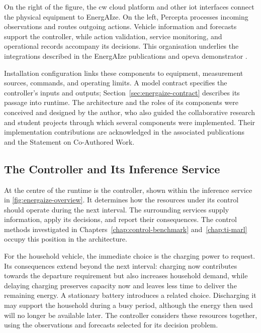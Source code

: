 \begin{samepage}
On the right of the figure, the \gls{cw} cloud platform and other \gls{iot} interfaces connect the physical equipment to EnergAIze. On the left, Percepta processes incoming observations and routes outgoing actions. Vehicle information and forecasts support the controller, while action validation, service monitoring, and operational records accompany its decisions. This organisation underlies the integrations described in the EnergAIze publications and \gls{opeva} demonstrator \parencite{fonseca2024energAIze,fonseca2025realworldrec,opeva2026d63}.

\end{samepage}

\begin{samepage}
Installation configuration links these components to equipment, measurement sources, commands, and operating limits. A model contract specifies the controller's inputs and outputs; Section~\ref{sec:energaize-contract} describes its passage into runtime. The architecture and the roles of its components were conceived and designed by the author, who also guided the collaborative research and student projects through which several components were implemented. Their implementation contributions are acknowledged in the associated publications and the Statement on Co-Authored Work.

\end{samepage}

\subsection{The Controller and Its Inference Service}
\label{sec:energaize-algorithms}

At the centre of the runtime is the controller, shown within the inference service in \cref{fig:energaize-overview}. It determines how the resources under its control should operate during the next interval. The surrounding services supply information, apply its decisions, and report their consequences. The control methods investigated in Chapters~\ref{chap:control-benchmark} and~\ref{chap:ti-marl} occupy this position in the architecture.

For the household vehicle, the immediate choice is the charging power to request. Its consequences extend beyond the next interval: charging now contributes towards the departure requirement but also increases household demand, while delaying charging preserves capacity now and leaves less time to deliver the remaining energy. A stationary battery introduces a related choice. Discharging it may support the household during a busy period, although the energy then used will no longer be available later. The controller considers these resources together, using the observations and forecasts selected for its decision problem.

